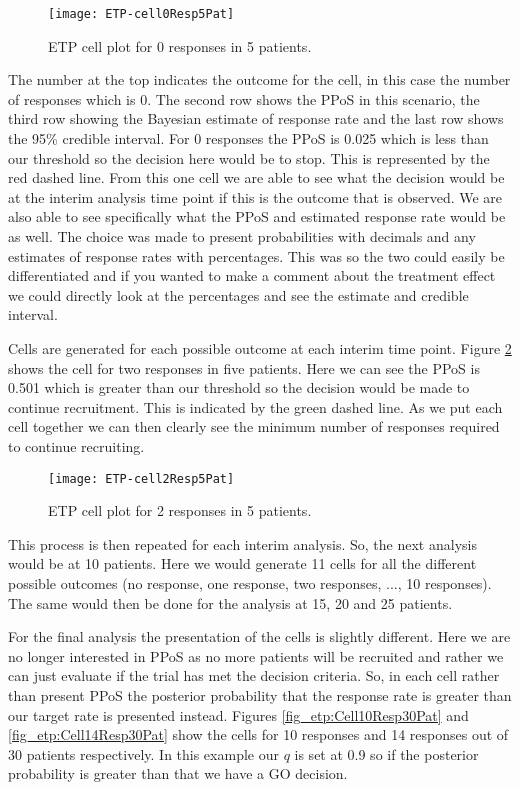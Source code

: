 \begin{figure}[h!]
	\centering
	\caption{ETP cell plot for 0 responses in 5 patients.}
	\label{fig_etp:Cell0Resp5Pat}
	\texttt{[image: ETP-cell0Resp5Pat]}
\end{figure}

The number at the top indicates the outcome for the cell, in this case the number of responses which is 0. The second row shows the PPoS in this scenario, the third row showing the Bayesian estimate of response rate and the last row shows the 95\% credible interval. For 0 responses the PPoS is 0.025 which is less than our threshold so the decision here would be to stop. This is represented by the red dashed line. From this one cell we are able to see what the decision would be at the interim analysis time point if this is the outcome that is observed. We are also able to see specifically what the PPoS and estimated response rate would be as well. The choice was made to present probabilities with decimals and any estimates of response rates with percentages. This was so the two could easily be differentiated and if you wanted to make a comment about the treatment effect we could directly look at the percentages and see the estimate and credible interval.   

Cells are generated for each possible outcome at each interim time point. Figure \ref{fig_etp:Cell2Resp5Pat} shows the cell for two responses in five patients. Here we can see the PPoS is 0.501 which is greater than our threshold so the decision would be made to continue recruitment. This is indicated by the green dashed line. As we put each cell together we can then clearly see the minimum number of responses required to continue recruiting.  

\begin{figure}[h!]
	\centering
	\caption{ETP cell plot for 2 responses in 5 patients.}
	\label{fig_etp:Cell2Resp5Pat}
	\texttt{[image: ETP-cell2Resp5Pat]}
\end{figure}

This process is then repeated for each interim analysis. So, the next analysis would be at 10 patients. Here we would generate 11 cells for all the different possible outcomes (no response, one response, two responses, ..., 10 responses). The same would then be done for the analysis at 15, 20 and 25 patients. 

For the final analysis the presentation of the cells is slightly different. Here we are no longer interested in PPoS as no more patients will be recruited and rather we can just evaluate if the trial has met the decision criteria. So, in each cell rather than present PPoS the posterior probability that the response rate is greater than our target rate is presented instead. Figures \ref{fig_etp:Cell10Resp30Pat} and \ref{fig_etp:Cell14Resp30Pat} show the cells for 10 responses and 14 responses out of 30 patients respectively. In this example our $q$ is set at 0.9 so if the posterior probability is greater than that we have a GO decision. 

